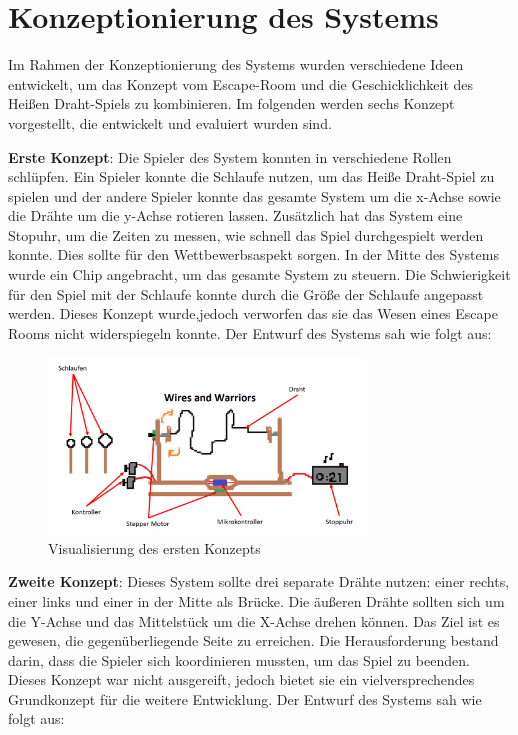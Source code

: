 \chapter{Konzeptionierung des Systems}

Im Rahmen der Konzeptionierung des Systems wurden verschiedene Ideen entwickelt, um das Konzept vom Escape-Room und die Geschicklichkeit des Heißen Draht-Spiels zu kombinieren. Im folgenden werden sechs Konzept vorgestellt, die entwickelt und evaluiert wurden sind.

\textbf{Erste Konzept}: Die Spieler des System konnten in verschiedene Rollen schlüpfen. Ein Spieler konnte die Schlaufe nutzen, um das Heiße Draht-Spiel zu spielen und der andere Spieler konnte das gesamte System um die x-Achse sowie die Drähte um die y-Achse rotieren lassen. Zusätzlich hat das System eine Stopuhr, um die Zeiten zu messen, wie schnell das Spiel durchgespielt werden konnte. Dies sollte für den Wettbewerbsaspekt sorgen. In der Mitte des Systems wurde ein Chip angebracht, um das gesamte System zu steuern. Die Schwierigkeit für den Spiel mit der Schlaufe konnte durch die Größe der Schlaufe angepasst werden. Dieses Konzept wurde,jedoch verworfen das sie das Wesen eines Escape Rooms nicht widerspiegeln konnte. Der Entwurf des Systems sah wie folgt aus: 


\begin{figure}[H]
 \centerline{\includegraphics[width=0.75\textwidth,scale=1]{./images/Konzeptpapier_1.png}}
 \caption{Visualisierung des ersten Konzepts}\label{imageLabel}
\end{figure}  

\textbf{Zweite Konzept}: Dieses System sollte drei separate Drähte nutzen: einer rechts, einer links und einer in der Mitte als Brücke. Die äußeren Drähte sollten sich um die Y-Achse und das Mittelstück um die X-Achse drehen können. Das Ziel ist es gewesen, die gegenüberliegende Seite zu erreichen. Die Herausforderung bestand darin, dass die Spieler sich koordinieren mussten, um das Spiel zu beenden. Dieses Konzept war nicht ausgereift, jedoch bietet sie ein vielversprechendes Grundkonzept für die weitere Entwicklung. Der Entwurf des Systems sah wie folgt aus:

